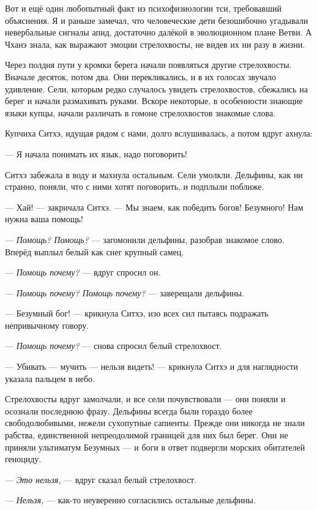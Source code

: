 Вот и ещё один любопытный факт из психофизиологии тси, требовавший объяснения.
Я и раньше замечал, что человеческие дети безошибочно угадывали невербальные сигналы апид, достаточно далёкой в эволюционном плане Ветви.
А Чханэ знала, как выражают эмоции стрелохвосты, не видев их ни разу в жизни.

Через полдня пути у кромки берега начали появляться другие стрелохвосты.
Вначале десяток, потом два. Они перекликались, и в их голосах звучало удивление.
Сели, которым редко случалось увидеть стрелохвостов, сбежались на берег и начали размахивать руками.
Вскоре некоторые, в особенности знающие языки купцы, начали различать в гомоне стрелохвостов знакомые слова.

Купчиха Ситхэ, идущая рядом с нами, долго вслушивалась, а потом вдруг ахнула:

--- Я начала понимать их язык, надо поговорить!

Ситхэ забежала в воду и махнула остальным.
Сели умолкли.
Дельфины, как ни странно, поняли, что с ними хотят поговорить, и подплыли поближе.

--- Хай! --- закричала Ситхэ.
--- Мы знаем, как победить богов!
Безумного!
Нам нужна ваша помощь!

--- \emph{Помощь? Помощь?} --- загомонили дельфины, разобрав знакомое слово.
Вперёд выплыл белый как снег крупный самец.

--- \emph{Помощь почему?} --- вдруг спросил он.

--- \emph{Помощь почему? Помощь почему?} --- заверещали дельфины.

--- Безумный бог! --- крикнула Ситхэ, изо всех сил пытаясь подражать непривычному говору.

--- \emph{Помощь почему?} --- снова спросил белый стрелохвост.

--- Убивать --- мучить --- нельзя видеть! --- крикнула Ситхэ и для наглядности указала пальцем в небо.

Стрелохвосты вдруг замолчали, и все сели почувствовали --- они поняли и осознали последнюю фразу.
Дельфины всегда были гораздо более свободолюбивыми, нежели сухопутные сапиенты.
Прежде они никогда не знали рабства, единственной непреодолимой границей для них был берег.
Они не приняли ультиматум Безумных --- и боги в ответ подвергли морских обитателей геноциду.

--- \emph{Это нельзя,} --- вдруг сказал белый стрелохвост.

--- \emph{Нельзя,} --- как-то неуверенно согласились остальные дельфины.

